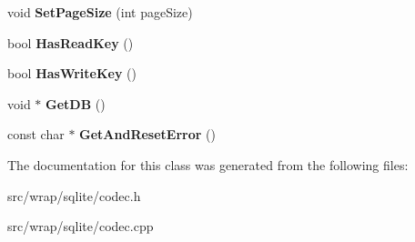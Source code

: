 \begin{DoxyCompactItemize}
\item 
\hypertarget{classCodec_aa563d33fd978d3c4942e2bdb426ba20d}{void {\bfseries Set\-Page\-Size} (int page\-Size)}\label{classCodec_aa563d33fd978d3c4942e2bdb426ba20d}

\item 
\hypertarget{classCodec_a2a430fa442fbead88859d038db8aba79}{bool {\bfseries Has\-Read\-Key} ()}\label{classCodec_a2a430fa442fbead88859d038db8aba79}

\item 
\hypertarget{classCodec_a6dbf3996a084e064809549f5290380db}{bool {\bfseries Has\-Write\-Key} ()}\label{classCodec_a6dbf3996a084e064809549f5290380db}

\item 
\hypertarget{classCodec_a4c03c4b873dc29fcaa99f817da0cf5b9}{void $\ast$ {\bfseries Get\-D\-B} ()}\label{classCodec_a4c03c4b873dc29fcaa99f817da0cf5b9}

\item 
\hypertarget{classCodec_a6097bf49910df0912e2a68ad86c94164}{const char $\ast$ {\bfseries Get\-And\-Reset\-Error} ()}\label{classCodec_a6097bf49910df0912e2a68ad86c94164}

\end{DoxyCompactItemize}


The documentation for this class was generated from the following files\-:\begin{DoxyCompactItemize}
\item 
src/wrap/sqlite/codec.\-h\item 
src/wrap/sqlite/codec.\-cpp\end{DoxyCompactItemize}
